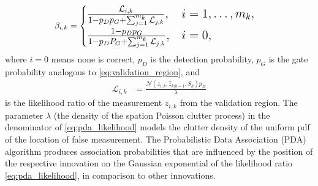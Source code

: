 \begin{align}
    \beta_{i,k} &=
    \begingroup
    \Large
    \begin{cases}
        \frac{\mathcal{L}_{i,k}}{1-p_D p_G + \sum_{j=1}^{m_k}\mathcal{L}_{j,k}}, & i=1, \dots, m_k, \\
        \frac{1-p_D p_G}{1-p_D P_G + \sum_{j=1}^{m_k}\mathcal{L}_{j,k}}, & i =0,
    \end{cases}
    \label{eq:pda_beta}
    \endgroup
\end{align}
where $i=0$ means none is correct, $p_D$ is the detection probability, $p_G$ is the gate probability analogous to \eqref{eq:validation_region}, and
\begin{align}
    \mathcal{L}_{i,k} &= \frac{\mathcal{N}(z_{i,k};\hat{z}_{k|k-1}, S_k) p_D}{\lambda} \label{eq:pda_likelihood}
\end{align}
is the likelihood ratio of the measurement $z_{i,k}$ from the validation region. The parameter $\lambda$ (the density of the spation Poisson clutter process) in the denominator of \eqref{eq:pda_likelihood} models the clutter density of the uniform pdf of the location of false measurement. The Probabilistic Data Association (PDA) algorithm produces association probabilities that are influenced by the position of the respective innovation on the Gaussian exponential of the likelihood ratio \eqref{eq:pda_likelihood}, in comparison to other innovations.

